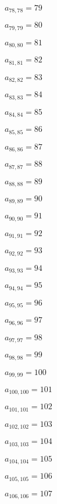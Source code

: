 \documentclass[a4paper,12pt]{article}
\begin{document}
$a _{ 78, 78 } = 79$

$a _{ 79, 79 } = 80$

$a _{ 80, 80 } = 81$

$a _{ 81, 81 } = 82$

$a _{ 82, 82 } = 83$

$a _{ 83, 83 } = 84$

$a _{ 84, 84 } = 85$

$a _{ 85, 85 } = 86$

$a _{ 86, 86 } = 87$

$a _{ 87, 87 } = 88$

$a _{ 88, 88 } = 89$

$a _{ 89, 89 } = 90$

$a _{ 90, 90 } = 91$

$a _{ 91, 91 } = 92$

$a _{ 92, 92 } = 93$

$a _{ 93, 93 } = 94$

$a _{ 94, 94 } = 95$

$a _{ 95, 95 } = 96$

$a _{ 96, 96 } = 97$

$a _{ 97, 97 } = 98$

$a _{ 98, 98 } = 99$

$a _{ 99, 99 } = 100$

$a _{ 100, 100 } = 101$

$a _{ 101, 101 } = 102$

$a _{ 102, 102 } = 103$

$a _{ 103, 103 } = 104$

$a _{ 104, 104 } = 105$

$a _{ 105, 105 } = 106$

$a _{ 106, 106 } = 107$
\end{document}
